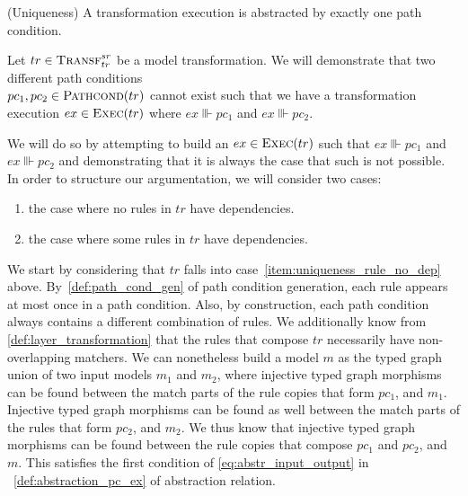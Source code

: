 \begin{lemma} (Uniqueness) 
\label{lem:uniqueness}
A transformation execution is abstracted by exactly one path condition.
\end{lemma}
\begin{ps}
Let $tr\in \textsc{Transf}^{sr}_{tr}$ be a model transformation. We will demonstrate that two different path conditions\\$pc_1, pc_2\in \textsc{Pathcond}(tr)$ cannot exist such that we have a transformation execution $ex\in \textsc{Exec}(tr)$ where $ex\Vvdash pc_1$ and $ex\Vvdash pc_2$.

We will do so by attempting to build an $ex\in \textsc{Exec}(tr)$ such that $ex\Vvdash pc_1$ and $ex\Vvdash pc_2$ and demonstrating that it is always the case that such is not possible. In order to structure our argumentation, we will consider two cases:
\begin{enumerate}
  \item\label{item:uniqueness_rule_no_dep} the case where no rules in $tr$ have dependencies.
  \item\label{item:uniqueness_rule_has_dep} the case where some rules in $tr$ have dependencies.
\end{enumerate}

We start by considering that $tr$ falls into case~\ref{item:uniqueness_rule_no_dep} above. By~\cref{def:path_cond_gen} of path condition generation, each rule appears at most once in a path condition. Also, by construction, each path condition always contains a different combination of rules. We additionally know from \cref{def:layer_transformation} that the rules that compose $tr$ necessarily have non-overlapping matchers. We can nonetheless build a model $m$ as the typed graph union of two input models $m_1$ and $m_2$, where injective typed graph morphisms can be found between the match parts of the rule copies that form $pc_1$, and $m_1$. Injective typed graph morphisms can be found as well between the match parts of the rules that form $pc_2$, and $m_2$. We thus know that injective typed graph morphisms can be found between the rule copies that compose $pc_1$ and $pc_2$, and $m$. This satisfies the first condition of \cref{eq:abstr_input_output} in ~\cref{def:abstraction_pc_ex} of abstraction relation. 


\end{ps}
